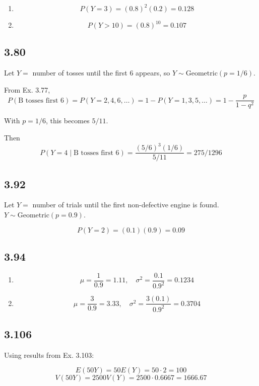 \documentclass[
  letterpaper,
  DIV=11,
  numbers=noendperiod]{scrartcl}
\begin{document}
\begin{enumerate}
\def\labelenumi{(\alph{enumi})}
\item
  \[P(Y=3) = (0.8)^2 (0.2) = 0.128\]
\item
  \[P(Y > 10) = (0.8)^{10} = 0.107\]
\end{enumerate}

\subsection{3.80}\label{section-11}

Let \(Y =\) number of tosses until the first 6 appears, so
\(Y \sim \text{Geometric}(p=1/6)\).

From Ex. 3.77,
\[P(\text{B tosses first 6}) = P(Y=2,4,6,\ldots) = 1 - P(Y=1,3,5,\ldots) = 1 - \frac{p}{1-q^2}\]

With \(p=1/6\), this becomes \(5/11\).

Then
\[P(Y=4 \mid \text{B tosses first 6}) = \frac{(5/6)^3 (1/6)}{5/11} = 275/1296\]

\subsection{3.92}\label{section-12}

Let \(Y =\) number of trials until the first non-defective engine is
found. \(Y \sim \text{Geometric}(p=0.9)\).

\[P(Y=2) = (0.1)(0.9) = 0.09\]

\subsection{3.94}\label{section-13}

\begin{enumerate}
\def\labelenumi{(\alph{enumi})}
\item
  \[\mu = \frac{1}{0.9} = 1.11, \quad \sigma^2 = \frac{0.1}{0.9^2} = 0.1234\]
\item
  \[\mu = \frac{3}{0.9} = 3.33, \quad \sigma^2 = \frac{3(0.1)}{0.9^2} = 0.3704\]
\end{enumerate}

\subsection{3.106}\label{section-14}

Using results from Ex. 3.103:

\[E(50Y) = 50E(Y) = 50 \cdot 2 = 100\]
\[V(50Y) = 2500V(Y) = 2500 \cdot 0.6667 = 1666.67\]
\end{document}
